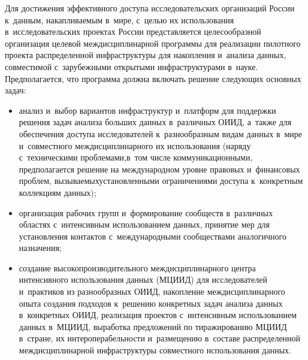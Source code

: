 \begin{multicols}{2}
  Для достижения эффективного доступа исследовательских организаций России 
к~данным, накапливаемым в~мире, с~целью их использования в~исследовательских 
проектах России представляется целесообразной организация целевой 
междисциплинарной программы для реализации пилотного проекта распределенной 
инфраструктуры для накопления и~анализа данных, совместимой с~зарубежными 
открытыми инфраструктурами в~науке.
  Предполагается, что программа должна включать решение следующих основных задач: 
  \begin{itemize}
\item анализ и~выбор вариантов инфраструктур и~платформ для поддержки решения 
задач анализа больших данных в~различных \mbox{ОИИД}, а~так\-же для обеспечения 
доступа исследователей к~разнообразным видам данных \mbox{в~мире} и~совместного 
междисциплинарного их исполь\-зования (наряду с~техническими проблемами,\linebreak в~том 
числе коммуникационными, предполагается решение на международном уровне 
правовых и~финансовых проблем, вызываемых\linebreak установленными ограничениями 
доступа к~конкретным коллекциям данных);
\item организация рабочих групп и~формирование сообществ в~различных областях 
с~интенсивным использованием данных, принятие мер для установления контактов 
с~международными сообществами аналогичного назначения;
\item создание высокопроизводительного междисциплинарного центра 
интенсивного использования данных (МЦИИД) для исследователей и~практиков из 
разнообразных ОИИД, накопление междисциплинарного опыта создания подходов 
к~решению конкретных задач анализа данных в~конкретных ОИИД, реализация 
проектов с~интенсивным использованием данных в~МЦИИД, выработка 
предложений по тиражированию МЦИИД в~стране, их интероперабельности 
и~размещению в~составе распределенной междисциплинарной инфраструктуры 
совместного использования данных.
\end{itemize}


{\small\frenchspacing
 {%
 \begin{thebibliography}{99}


\end{thebibliography}}}
\end{multicols}
